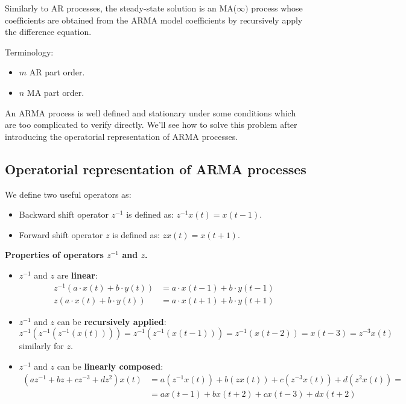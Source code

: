Similarly to AR processes, the steady-state solution is an MA($\infty)$ process whose coefficients are obtained from the ARMA model coefficients by recursively apply the difference equation.
 
Terminology:
\begin{itemize}
	\item $m$ AR part order.
	\item $n$ MA part order.
\end{itemize}

An ARMA process is well defined and stationary under some conditions which are too complicated to verify directly.
We'll see how to solve this problem after introducing the operatorial representation of ARMA processes.

\newpage

\subsection{Operatorial representation of ARMA processes}

\begin{defn}
	We define two useful operators as:
	\begin{itemize}
		\item Backward shift operator $z^{-1}$ is defined as: $z^{-1} x(t)=x(t-1)$.
		\item Forward shift operator $z$ is defined as: $z x(t)=x(t+1)$.	
	\end{itemize}
	
\end{defn}

\textbf{Properties of operators $z^{-1}$ and $z$.}

\begin{itemize}
	\item $z^{-1}$ and $z$ are \textbf{linear}:
		\begin{align*}
			z^{-1}(a \cdot x(t)+b \cdot y(t))&=a \cdot x(t-1)+b \cdot y(t-1) \\
			z(a \cdot x(t)+b \cdot y(t))&=a \cdot x(t+1)+b \cdot y(t+1)
		\end{align*}
	\item $z^{-1}$ and $z$ can be \textbf{recursively applied}:
		\[
			z^{-1}(z^{-1}(z^{-1}(x(t))))=z^{-1}(z^{-1}(x(t-1)))=z^{-1}(x(t-2))=x(t-3)=z^{-3} x(t)
		\]
		similarly for $z$.
	\item $z^{-1}$ and $z$ can be \textbf{linearly composed}:
		\begin{align*}
			(a z^{-1}+b z+c z^{-3}+d z^{2}) x(t)&=a(z^{-1} x(t))+b(z x(t))+c(z^{-3} x(t))+d(z^{2} x(t))= \\
			&=a x(t-1)+b x(t+2)+c x(t-3)+d x(t+2)
		\end{align*}
\end{itemize}

